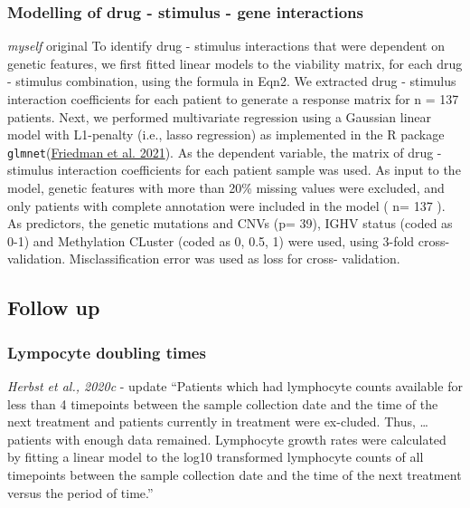 \documentclass[11pt, a4paper, twosided]{book}
\begin{document}
\hypertarget{modelling-of-drug---stimulus---gene-interactions}{%
\subsubsection{Modelling of drug - stimulus - gene interactions}\label{modelling-of-drug---stimulus---gene-interactions}}

\emph{myself} original
To identify drug - stimulus interactions that were dependent on genetic features, we first fitted linear models to the viability matrix, for each drug - stimulus combination, using the formula in Eqn2. We extracted drug - stimulus interaction coefficients for each patient to generate a response matrix for n = 137 patients. Next, we performed multivariate regression using a Gaussian linear model with L1-penalty (i.e., lasso regression) as implemented in the R package \texttt{glmnet}(\protect\hyperlink{ref-R-glmnet}{Friedman et al. 2021}). As the dependent variable, the matrix of drug - stimulus interaction coefficients for each patient sample was used. As input to the model, genetic features with more than 20\% missing values were excluded, and only patients with complete annotation were included in the model ( n= 137 ). As predictors, the genetic mutations and CNVs (p= 39), IGHV status (coded as 0-1) and Methylation CLuster (coded as 0, 0.5, 1) were used, using 3-fold cross-validation. Misclassification error was used as loss for cross- validation.

\hypertarget{follow-up}{%
\subsection{Follow up}\label{follow-up}}

\hypertarget{lympocyte-doubling-times}{%
\subsubsection{Lympocyte doubling times}\label{lympocyte-doubling-times}}

\emph{Herbst et al., 2020c} - update
``Patients which had lymphocyte counts available for less than 4 timepoints between the sample
collection date and the time of the next treatment and patients currently in treatment were ex-cluded. Thus, \ldots{} patients with enough data remained. Lymphocyte growth rates were calculated by fitting a linear model to the log10 transformed lymphocyte counts of all timepoints between the sample collection date and the time of the next treatment versus the period of time.''
\end{document}
